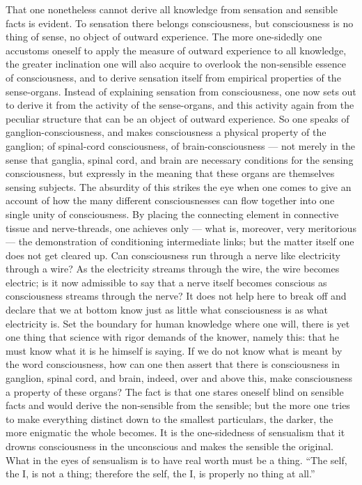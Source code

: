 \documentclass[12pt]{book}
\begin{document}
That one nonetheless cannot derive all knowledge from sensation and sensible
facts is evident. To sensation there belongs consciousness, but consciousness
is no thing of sense, no object of outward experience. The more one-sidedly
one accustoms oneself to apply the measure of outward experience to all
knowledge, the greater inclination one will also acquire to overlook the
non-sensible essence of consciousness, and to derive sensation itself from
empirical properties of the sense-organs. Instead of explaining sensation
from consciousness, one now sets out to derive it from the activity of the
sense-organs, and this activity again from the peculiar structure that can be
an object of outward experience. So one speaks of ganglion-consciousness, and
makes consciousness a physical property of the ganglion; of spinal-cord
consciousness, of brain-consciousness --- not merely in the sense that
ganglia, spinal cord, and brain are necessary conditions for the sensing
consciousness, but expressly in the meaning that these organs are themselves
sensing subjects. The absurdity of this strikes the eye when one comes to give
an account of how the many different consciousnesses can flow together into
one single unity of consciousness. By placing the connecting element in
connective tissue and nerve-threads, one achieves only --- what is, moreover,
very meritorious --- the demonstration of conditioning intermediate links; but
the matter itself one does not get cleared up. Can consciousness run through a
nerve like electricity through a wire? As the electricity streams through the
wire, the wire becomes electric; is it now admissible to say that a nerve
itself becomes conscious as consciousness streams through the nerve? It does
not help here to break off and declare that we at bottom know just as little
what consciousness is as what electricity is. Set the boundary for human
knowledge where one will, there is yet one thing that science with rigor
demands of the knower, namely this: that he must know what it is he himself is
saying. If we do not know what is meant by the word consciousness, how can one
then assert that there is consciousness in ganglion, spinal cord, and brain,
indeed, over and above this, make consciousness a property of these organs?
The fact is that one stares oneself blind on sensible facts and would derive
the non-sensible from the sensible; but the more one tries to make everything
distinct down to the smallest particulars, the darker, the more enigmatic the
whole becomes. It is the one-sidedness of sensualism that it drowns
consciousness in the unconscious and makes the sensible the original. What in
the eyes of sensualism is to have real worth must be a thing. ``The self, the
I, is not a thing; therefore the self, the I, is properly no thing at all.''
\end{document}
